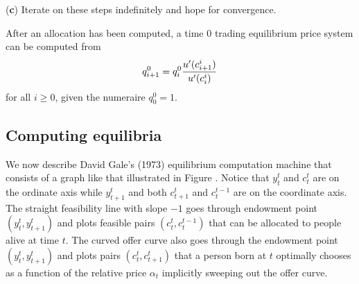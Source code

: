 \medskip
\item {({\bf c})} Iterate on these steps indefinitely and hope for convergence.




\medskip

\noindent After an allocation has been computed, a time $0$ 
trading equilibrium price system can be computed from
$$ q^0_{i+1} = q^0_i {u'(c^i_{i+1}) \over u'(c^i_i) } $$
for all $i \geq 0$, given the numeraire $q^0_0 =1$.






\subsection{Computing equilibria}
We now describe David Gale's (1973) equilibrium computation machine that consists of a graph like that
 illustrated
in Figure .
Notice that  $y_t^t$ and  $c_t^t$  are on the ordinate axis while
$y_{t+1}^t$ and both $c_{t+1}^t$ and $c_{t}^{t-1}$ are on the coordinate axis.
The straight  feasibility line with slope $-1$ goes through endowment point $(y_t^t, y^t_{t+1})$ and plots feasible
pairs   $(c_t^t, c_t^{t-1})$ that can be allocated to people alive at time $t$.  The curved offer curve also goes through the endowment point $(y_t^t, y^t_{t+1})$
and plots pairs $(c_t^t, c^t_{t+1})$ that a person born at $t$ optimally chooses as a function of the relative price $\alpha_t$ implicitly
sweeping out the offer curve.   


